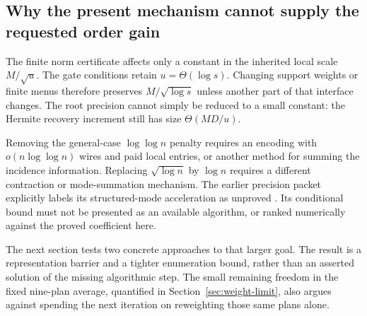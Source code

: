 \subsection{Why the present mechanism cannot supply the requested order gain}

The finite norm certificate affects only a constant in the inherited local
scale $M/\sqrt u$. The gate conditions retain $u=\Theta(\log s)$.
Changing support weights or finite menus therefore preserves
$M/\sqrt{\log s}$ unless another part of that interface changes.
The root precision cannot simply be reduced to a small constant: the
Hermite recovery increment still has size $\Theta(MD/u)$.

Removing the general-case $\log\log n$ penalty requires an encoding with
$o(n\log\log n)$ wires and paid local entries, or another method for
summing the incidence information. Replacing $\sqrt{\log n}$ by
$\log n$ requires a different contraction or mode-summation mechanism.
The earlier precision packet explicitly labels its structured-mode
acceleration as unproved \cite{precision}. Its conditional bound must
not be presented as an available algorithm, or ranked numerically against
the proved coefficient here.

The next section tests two concrete approaches to that larger goal. The
result is a representation barrier and a tighter enumeration bound, rather
than an asserted solution of the missing algorithmic step. The small
remaining freedom in the fixed nine-plan average, quantified in
Section~\ref{sec:weight-limit}, also argues against spending the next
iteration on reweighting those same plans alone.

